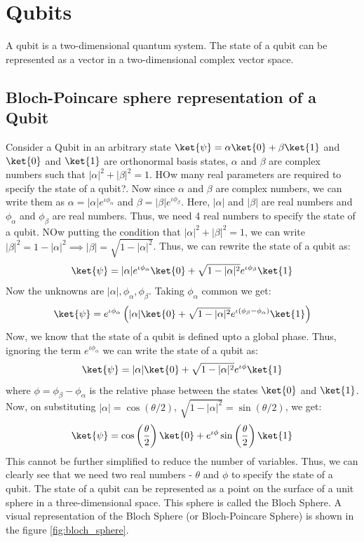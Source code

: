 \documentclass[12pt, oneside]{book}
\theoremstyle{definition}
\theoremstyle{definition}
\theoremstyle{remark}
\begin{document}
\chapter{Qubits}
A qubit is a two-dimensional quantum system. The state of a qubit can be represented as a vector in a two-dimensional complex vector space.

\section{Bloch-Poincare sphere representation of a Qubit}
Consider a Qubit in an arbitrary state $\ket{\psi}=\alpha\ket{0}+\beta\ket{1}$ and $\ket{0}$ and $\ket{1}$ are orthonormal basis states, $\alpha$ and $\beta$ are complex numbers such that $|\alpha|^2+|\beta|^2=1$.
HOw many real parameters are required to specify the state of a qubit?. Now since $\alpha$ and $\beta$ are complex numbers, we can write them as $\alpha=|\alpha|e^{\iota \phi_{\alpha}}$
and $\beta = |\beta| e^{\iota \phi_{\beta}}$. Here, $|\alpha|$ and $|\beta|$ are real numbers and $\phi_{\alpha}$ and $\phi_{\beta}$ are real numbers. Thus, we need 4 real numbers to specify the state of a qubit.
NOw putting the condition that $|\alpha|^2+|\beta|^2=1$, we can write $|\beta|^2=1-|\alpha|^2 \implies |\beta|=\sqrt{1-|\alpha|^2}$.
Thus, we can rewrite the state of a qubit as:
\[ 
    \ket{\psi}=|\alpha|e^{\iota \phi_{\alpha}}\ket{0}+\sqrt{1-|\alpha|^2}e^{\iota \phi_{\beta}}\ket{1}
\]
Now the unknowns are $|\alpha|,\phi_{\alpha},\phi_{\beta}$. Taking $\phi_{\alpha}$ common we get:
\[
    \ket{\psi}=e^{\iota \phi_{\alpha}}\left(|\alpha|\ket{0}+\sqrt{1-|\alpha|^2}e^{\iota(\phi_{\beta}-\phi_{\alpha})}\ket{1}\right)
\]
Now, we know that the state of a qubit is defined upto a global phase. Thus, ignoring the term
$e^{\iota \phi_{\alpha}}$ we can write the state of a qubit as:
\[
    \ket{\psi}=|\alpha|\ket{0}+\sqrt{1-|\alpha|^2}e^{\iota \phi}\ket{1}
\]
where $\phi=\phi_{\beta}-\phi_{\alpha}$ is the relative phase between the states $\ket{0}$ and $\ket{1}$. 
Now, on substituting $|\alpha|=\cos(\theta/2)$, $\sqrt{1-|\alpha|^2}=\sin(\theta/2)$, we get:
\[
    \ket{\psi}=\cos\left(\frac{\theta}{2}\right)\ket{0}+e^{\iota \phi}\sin\left(\frac{\theta}{2}\right)\ket{1}
\]
This cannot be further simplified to reduce the number of variables. Thus, we can clearly see that we need two real numbers - $\theta$ and $\phi$ to specify the state of a qubit.
The state of a qubit can be represented as a point on the surface of a unit sphere in a three-dimensional space. This sphere is called the Bloch Sphere.
A visual representation of the Bloch Sphere (or Bloch-Poincare Sphere) is shown in the figure \ref{fig:bloch_sphere}.
\end{document}
